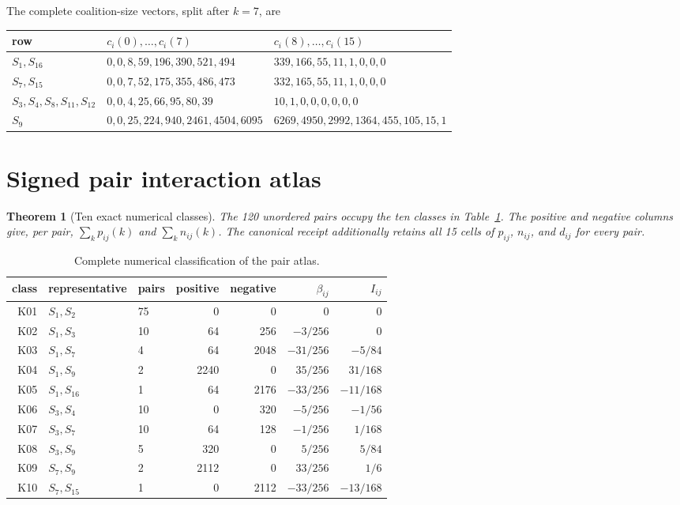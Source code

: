 \documentclass[10pt]{article}
\newtheorem{theorem}{Theorem}
\begin{document}
The complete coalition-size vectors, split after $k=7$, are
\begin{center}
\scriptsize
\begin{tabular}{@{}l p{} p{}@{}}
\toprule
row & $c_i(0),\ldots,c_i(7)$ & $c_i(8),\ldots,c_i(15)$\\
\midrule
$S_1,S_{16}$ & $0,0,8,59,196,390,521,494$ & $339,166,55,11,1,0,0,0$\\
$S_7,S_{15}$ & $0,0,7,52,175,355,486,473$ & $332,165,55,11,1,0,0,0$\\
$S_3,S_4,S_8,S_{11},S_{12}$ & $0,0,4,25,66,95,80,39$ & $10,1,0,0,0,0,0,0$\\
$S_9$ & $0,0,25,224,940,2461,4504,6095$ & $6269,4950,2992,1364,455,105,15,1$\\
\bottomrule
\end{tabular}
\end{center}

\section{Signed pair interaction atlas}
\begin{theorem}[Ten exact numerical classes]
The 120 unordered pairs occupy the ten classes in
Table~\ref{tab:classes}.  The positive and negative columns give, per pair,
$\sum_kp_{ij}(k)$ and $\sum_kn_{ij}(k)$.  The canonical receipt additionally
retains all 15 cells of $p_{ij}$, $n_{ij}$, and $d_{ij}$ for every pair.
\end{theorem}

\begin{table}[h]
\centering
\caption{Complete numerical classification of the pair atlas.}
\label{tab:classes}
\small
\begin{tabular}{@{}rllrrrr@{}}
\toprule
class & representative & pairs & positive & negative & $\beta_{ij}$ & $I_{ij}$\\
\midrule
K01 & $S_1,S_2$ & 75 & 0 & 0 & 0 & 0\\
K02 & $S_1,S_3$ & 10 & 64 & 256 & $-3/256$ & 0\\
K03 & $S_1,S_7$ & 4 & 64 & 2048 & $-31/256$ & $-5/84$\\
K04 & $S_1,S_9$ & 2 & 2240 & 0 & $35/256$ & $31/168$\\
K05 & $S_1,S_{16}$ & 1 & 64 & 2176 & $-33/256$ & $-11/168$\\
K06 & $S_3,S_4$ & 10 & 0 & 320 & $-5/256$ & $-1/56$\\
K07 & $S_3,S_7$ & 10 & 64 & 128 & $-1/256$ & $1/168$\\
K08 & $S_3,S_9$ & 5 & 320 & 0 & $5/256$ & $5/84$\\
K09 & $S_7,S_9$ & 2 & 2112 & 0 & $33/256$ & $1/6$\\
K10 & $S_7,S_{15}$ & 1 & 0 & 2112 & $-33/256$ & $-13/168$\\
\bottomrule
\end{tabular}
\end{table}
\end{document}
